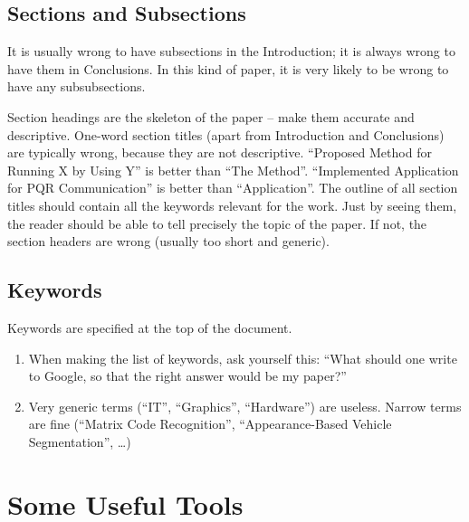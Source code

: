 \subsection{Sections and Subsections}
\label{sec:Sections}

It is usually wrong to have subsections in the Introduction; it is always wrong to have them in Conclusions.  In this kind of paper, it is very likely to be wrong to have any subsubsections.

Section headings are the skeleton of the paper -- make them accurate and descriptive.  One-word section titles (apart from Introduction and Conclusions) are typically wrong, because they are not descriptive.  
``Proposed Method for Running X by Using Y'' is better than ``The Method''.
``Implemented Application for PQR Communication'' is better than ``Application''.  The outline of all section titles should contain all the keywords relevant for the work.  Just by seeing them, the reader should be able to tell precisely the topic of the paper.  If not, the section headers are wrong (usually too short and generic).

\subsection{Keywords}
\label{sec:Keywords}

Keywords are specified at the top of the document.  
\begin{enumerate}[noitemsep]
	\item When making the list of keywords, ask yourself this: ``What should one write to Google, so that the right answer would be my paper?''
	\item Very generic terms (``IT'', ``Graphics'', ``Hardware'') are useless. Narrow terms are fine (``Matrix Code Recognition'', ``Appearance-Based Vehicle Segmentation'', \ldots)
\end{enumerate}

\section{Some Useful Tools}
\label{sec:UsefulTools}

